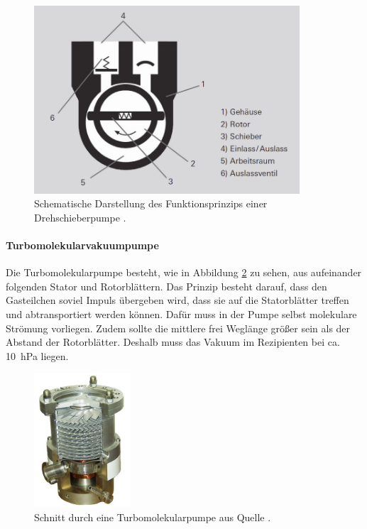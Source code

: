 \begin{figure}
  \centering
  \includegraphics[height = 7cm]{pics/dp.png}
  \caption{Schematische Darstellung des Funktionsprinzips einer Drehschieberpumpe \cite{pfeiffer:dp}.}
  \label{fig:dp}
\end{figure}
\FloatBarrier

\paragraph{Turbomolekularvakuumpumpe}
Die Turbomolekularpumpe besteht, wie in Abbildung \ref{fig:stm} zu sehen, aus aufeinander folgenden
Stator und Rotorblättern. Das Prinzip besteht darauf, dass den Gasteilchen soviel Impuls
übergeben wird, dass sie auf die Statorblätter treffen und abtransportiert werden können. Dafür
muss in der Pumpe selbst molekulare Strömung vorliegen. Zudem sollte die
mittlere frei Weglänge größer sein als der Abstand der Rotorblätter. Deshalb muss das Vakuum im
Rezipienten bei ca. \SI{10}{\hecto\pascal} liegen.

\begin{figure}
  \centering
  \includegraphics[height = 5cm]{pics/tm.jpg}
  \caption{Schnitt durch eine Turbomolekularpumpe aus Quelle \cite{wiki:tm}.}
  \label{fig:stm}
\end{figure}
\FloatBarrier

